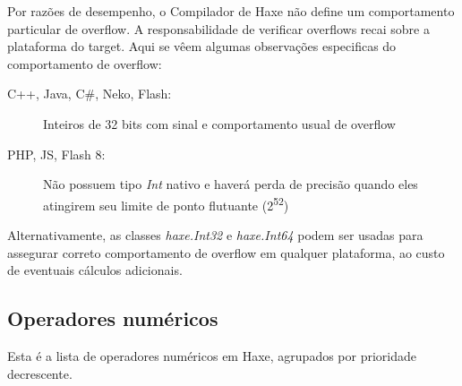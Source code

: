 Por razões de desempenho, o Compilador de Haxe não define um comportamento particular de overflow. A responsabilidade de verificar overflows recai sobre a plataforma do target. Aqui se vêem algumas observações especificas do comportamento de overflow:

\begin{description}
 \item[C++, Java, C\#, Neko, Flash:] Inteiros de 32 bits com sinal e comportamento usual de overflow
 \item[PHP, JS, Flash 8:] Não possuem tipo \emph{Int} nativo e haverá perda de precisão quando eles atingirem seu limite de ponto flutuante (2\textsuperscript{52})
\end{description}

Alternativamente, as classes \emph{haxe.Int32} e \emph{haxe.Int64} podem ser usadas para assegurar correto comportamento de overflow em qualquer plataforma, ao custo de eventuais cálculos adicionais.

\subsection{Operadores numéricos}
\label{types-numeric-operators}

Esta é a lista de operadores numéricos em Haxe, agrupados por prioridade decrescente.

